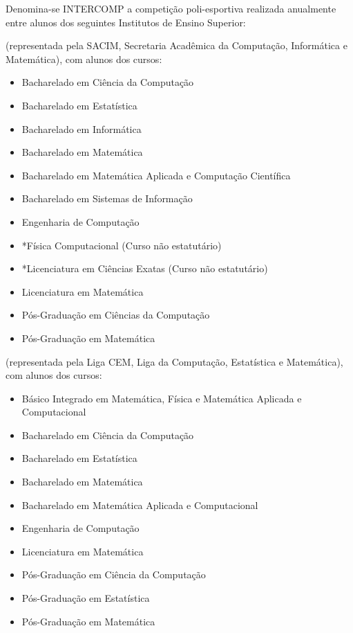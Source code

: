 \begin{article}
	\label{art:integrantes}
	Denomina-se INTERCOMP a competição poli-esportiva realizada anualmente entre alunos dos seguintes Institutos de Ensino Superior:
	\begin{description}[noitemsep]
		\item[USP - São Carlos] (representada pela SACIM, Secretaria Acadêmica da Computação, Informática e Matemática), com alunos dos cursos:
		\begin{itemize}[noitemsep]
			\item Bacharelado em Ciência da Computação
			\item Bacharelado em Estatística
			\item Bacharelado em Informática
			\item Bacharelado em Matemática
			\item Bacharelado em Matemática Aplicada e Computação Científica
			\item Bacharelado em Sistemas de Informação
			\item Engenharia de Computação
			\item *Física Computacional (Curso não estatutário)
			\item *Licenciatura em Ciências Exatas (Curso não estatutário)
			\item Licenciatura em Matemática
			\item Pós-Graduação em Ciências da Computação
			\item Pós-Graduação em Matemática
		\end{itemize}

		\item[UNICAMP] (representada pela Liga CEM, Liga da Computação, Estatística e Matemática), com alunos dos cursos:
		\begin{itemize}[noitemsep]
			\item Básico Integrado em Matemática, Física e Matemática Aplicada e Computacional
			\item Bacharelado em Ciência da Computação
			\item Bacharelado em Estatística
			\item Bacharelado em Matemática
			\item Bacharelado em Matemática Aplicada e Computacional
			\item Engenharia de Computação
			\item Licenciatura em Matemática
			\item Pós-Graduação em Ciência da Computação
			\item Pós-Graduação em Estatística
			\item Pós-Graduação em Matemática
		\end{itemize}


\end{description}
\end{article}
